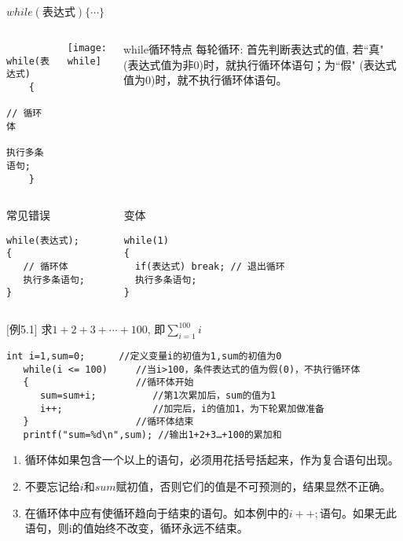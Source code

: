 \begin{frame}{$while(\text{表达式})\{ \cdots\}$}
\vspace{-0.5cm}
\begin{columns}[T]
	\begin{lstlisting} 
    while(表达式)   
    {
       // 循环体
       执行多条语句;  
    }   
    \end{lstlisting}
	\texttt{[image: while]}
	\small
	\begin{block}{while循环特点}
		\small
		每轮循环: 首先判断表达式的值, 若``真" (表达式值为非0)时，就执行循环体语句；为``假" (表达式值为0)时，就不执行循环体语句。
	\end{block}
\end{columns}
\vspace{-0.4cm}
\begin{columns}
\begin{block}{常见错误}
\begin{lstlisting} 
while(表达式); 
{
   // 循环体
   执行多条语句;    
}
\end{lstlisting}
\end{block}
\begin{block}{变体}
\begin{lstlisting} 
while(1)  
{
  if(表达式) break; // 退出循环
  执行多条语句;    
}
\end{lstlisting}
\end{block}
\end{columns}
\end{frame}

\begin{frame}
$[$例5.1$]$ 求$1+2+3+\cdots+100$, 即$\sum\limits_{i=1}^{100}i$
\medskip
\begin{lstlisting}[frame=lines]
   int i=1,sum=0;      //定义变量i的初值为1,sum的初值为0  
   while(i <= 100)     //当i>100，条件表达式的值为假(0)，不执行循环体
   {                   //循环体开始
      sum=sum+i;          //第1次累加后，sum的值为1
      i++;                //加完后，i的值加1，为下轮累加做准备
   }                   //循环体结束
   printf("sum=%d\n",sum); //输出1+2+3…+100的累加和                
\end{lstlisting}
\begin{enumerate}
	\setlength{\itemsep}{.2cm}
	\item 循环体如果包含一个以上的语句，必须用花括号括起来，作为复合语句出现。
	\item 不要忘记给$i$和$sum$赋初值，否则它们的值是不可预测的，结果显然不正确。
	\item 在循环体中应有使循环趋向于结束的语句。如本例中的$i++;$语句。如果无此语句，则i的值始终不改变，循环永远不结束。
\end{enumerate}
\end{frame}

